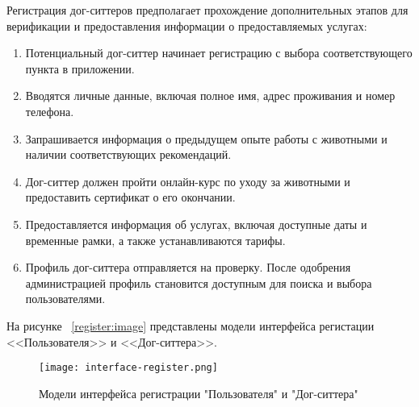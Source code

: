 Регистрация дог-ситтеров предполагает прохождение дополнительных этапов для верификации и предоставления информации о предоставляемых услугах:
\begin{enumerate}
    \item Потенциальный дог-ситтер начинает регистрацию с выбора соответствующего пункта в приложении.
    \item Вводятся личные данные, включая полное имя, адрес проживания и номер телефона.
    \item Запрашивается информация о предыдущем опыте работы с животными и наличии соответствующих рекомендаций.
    \item Дог-ситтер должен пройти онлайн-курс по уходу за животными и предоставить сертификат о его окончании.
    \item Предоставляется информация об услугах, включая доступные даты и временные рамки, а также устанавливаются тарифы.
    \item Профиль дог-ситтера отправляется на проверку. После одобрения администрацией профиль становится доступным для поиска и выбора пользователями.
\end{enumerate}

На рисунке ~\ref{register:image} представлены модели интерфейса регистации <<Пользователя>> и <<Дог-ситтера>>.

\begin{figure}[h!]
    \texttt{[image: interface-register.png]}
    \caption{Модели интерфейса регистрации "Пользователя" и "Дог-ситтера"}
    \label{fig:register}
\end{figure}




